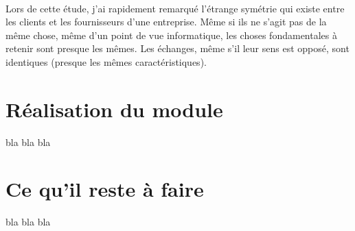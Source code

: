 ~

Lors de cette étude, j'ai rapidement remarqué l'étrange symétrie qui existe entre les clients et les fournisseurs d'une entreprise. Même si ils ne s'agit pas de la même chose, même d'un point de vue informatique, les choses fondamentales à retenir sont presque les mêmes. Les échanges, même s'il leur sens est opposé, sont identiques (presque les mêmes caractéristiques).

\section{Réalisation du module}
bla bla bla

\section{Ce qu'il reste à faire}
bla bla bla
